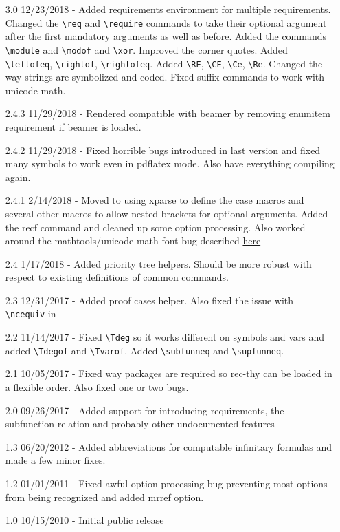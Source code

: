\documentclass[leqno,11pt]{amsart}
\begin{document}
\begin{itemize}
	\item[3.0] 12/23/2018 - Added requirements environment for multiple requirements.  Changed the \verb=\req= and \verb=\require= commands to take their optional argument after the first mandatory arguments as well as before.  Added the commands \verb=\module= and \verb=\modof= and \verb=\xor=.  Improved the corner quotes. Added \verb=\leftofeq=, \verb=\rightof=, \verb=\rightofeq=.  Added \verb=\RE=, \verb=\CE=, \verb=\Ce=, \verb=\Re=.  Changed the way strings are symbolized and coded.  Fixed suffix commands to work with unicode-math.
	\item[2.4.3] 11/29/2018 - Rendered compatible with beamer by removing enumitem requirement if beamer is loaded.
	\item[2.4.2] 11/29/2018 - Fixed horrible bugs introduced in last version and fixed many symbols to work even in pdflatex mode.  Also have everything compiling again.
	\item[2.4.1] 2/14/2018 - Moved to using xparse to define the case macros and several other macros to allow nested brackets for optional arguments.  Added the recf command and cleaned up some option processing.  Also worked around the mathtools/unicode-math font bug described \href{https://tex.stackexchange.com/questions/335164/incompatibility-with-mathtools-and-unicode-math-in-xelatex/335177}{here}
	\item[2.4] 1/17/2018 - Added priority tree helpers.  Should be more robust with respect to existing definitions of common commands.
	\item[2.3] 12/31/2017 - Added proof cases helper.  Also fixed the issue with \verb=\ncequiv= in \XeLaTeX
	\item[2.2] 11/14/2017 - Fixed \verb=\Tdeg= so it works different on symbols and vars and added \verb=\Tdegof= and \verb=\Tvarof=.  Added \verb=\subfunneq= and \verb=\supfunneq=.
	\item[2.1] 10/05/2017 - Fixed way packages are required so rec-thy can be loaded in a flexible order.  Also fixed one or two bugs.
	\item[2.0] 09/26/2017 - Added support for introducing requirements, the subfunction relation and probably other undocumented features
	\item[1.3] 06/20/2012 - Added abbreviations for computable infinitary formulas and made a few minor fixes.
	\item[1.2] 01/01/2011 - Fixed awful option processing bug preventing most options from being recognized and added mrref option.
	\item[1.0] 10/15/2010 - Initial public release
\end{itemize}
\end{document}
